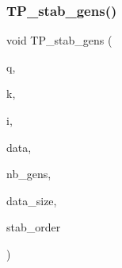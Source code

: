 \subsubsection{\texorpdfstring{T\+P\+\_\+stab\+\_\+gens()}{TP\_stab\_gens()}}
{\footnotesize\ttfamily void T\+P\+\_\+stab\+\_\+gens (\begin{DoxyParamCaption}\item[{\mbox{\hyperlink{galois_8h_a09fddde158a3a20bd2dcadb609de11dc}{I\+NT}}}]{q,  }\item[{\mbox{\hyperlink{galois_8h_a09fddde158a3a20bd2dcadb609de11dc}{I\+NT}}}]{k,  }\item[{\mbox{\hyperlink{galois_8h_a09fddde158a3a20bd2dcadb609de11dc}{I\+NT}}}]{i,  }\item[{\mbox{\hyperlink{galois_8h_a09fddde158a3a20bd2dcadb609de11dc}{I\+NT}} $\ast$\&}]{data,  }\item[{\mbox{\hyperlink{galois_8h_a09fddde158a3a20bd2dcadb609de11dc}{I\+NT}} \&}]{nb\+\_\+gens,  }\item[{\mbox{\hyperlink{galois_8h_a09fddde158a3a20bd2dcadb609de11dc}{I\+NT}} \&}]{data\+\_\+size,  }\item[{const \mbox{\hyperlink{galois_8h_ab6cc7b4aeb6ea31aba2b3fbfc83ff5e6}{B\+Y\+TE}} $\ast$\&}]{stab\+\_\+order }\end{DoxyParamCaption})}

